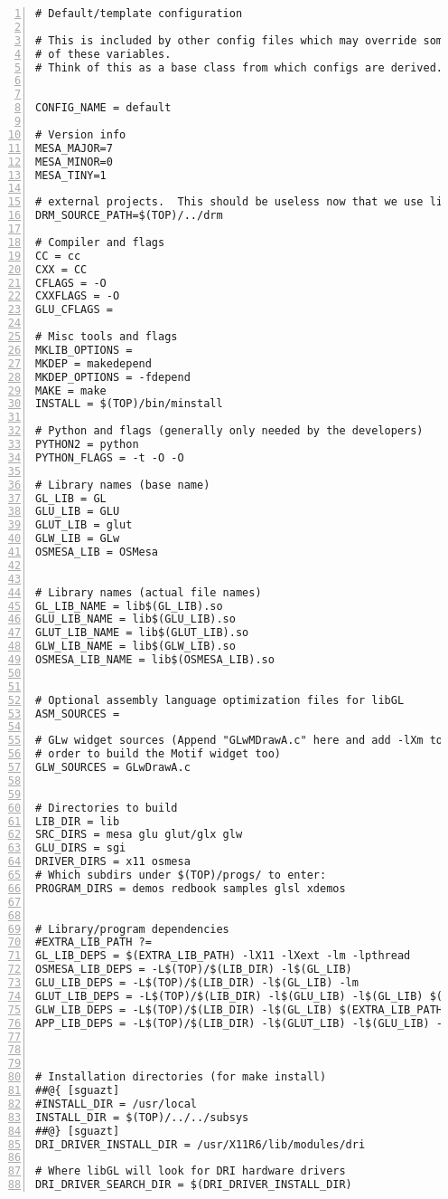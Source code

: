 \begin{lstlisting}[basicstyle={\small\ttfamily},breaklines=true,frame=single,numbers=left]
# Default/template configuration

# This is included by other config files which may override some
# of these variables.
# Think of this as a base class from which configs are derived.


CONFIG_NAME = default

# Version info
MESA_MAJOR=7
MESA_MINOR=0
MESA_TINY=1

# external projects.  This should be useless now that we use libdrm.
DRM_SOURCE_PATH=$(TOP)/../drm

# Compiler and flags
CC = cc
CXX = CC
CFLAGS = -O
CXXFLAGS = -O
GLU_CFLAGS = 

# Misc tools and flags
MKLIB_OPTIONS = 
MKDEP = makedepend
MKDEP_OPTIONS = -fdepend
MAKE = make
INSTALL = $(TOP)/bin/minstall

# Python and flags (generally only needed by the developers)
PYTHON2 = python
PYTHON_FLAGS = -t -O -O

# Library names (base name)
GL_LIB = GL
GLU_LIB = GLU
GLUT_LIB = glut
GLW_LIB = GLw
OSMESA_LIB = OSMesa


# Library names (actual file names)
GL_LIB_NAME = lib$(GL_LIB).so
GLU_LIB_NAME = lib$(GLU_LIB).so
GLUT_LIB_NAME = lib$(GLUT_LIB).so
GLW_LIB_NAME = lib$(GLW_LIB).so
OSMESA_LIB_NAME = lib$(OSMESA_LIB).so


# Optional assembly language optimization files for libGL
ASM_SOURCES = 

# GLw widget sources (Append "GLwMDrawA.c" here and add -lXm to GLW_LIB_DEPS in
# order to build the Motif widget too)
GLW_SOURCES = GLwDrawA.c


# Directories to build
LIB_DIR = lib
SRC_DIRS = mesa glu glut/glx glw
GLU_DIRS = sgi
DRIVER_DIRS = x11 osmesa
# Which subdirs under $(TOP)/progs/ to enter:
PROGRAM_DIRS = demos redbook samples glsl xdemos


# Library/program dependencies
#EXTRA_LIB_PATH ?=
GL_LIB_DEPS = $(EXTRA_LIB_PATH) -lX11 -lXext -lm -lpthread
OSMESA_LIB_DEPS = -L$(TOP)/$(LIB_DIR) -l$(GL_LIB)
GLU_LIB_DEPS = -L$(TOP)/$(LIB_DIR) -l$(GL_LIB) -lm
GLUT_LIB_DEPS = -L$(TOP)/$(LIB_DIR) -l$(GLU_LIB) -l$(GL_LIB) $(EXTRA_LIB_PATH) -lX11 -lXmu -lXt -lXi -lm
GLW_LIB_DEPS = -L$(TOP)/$(LIB_DIR) -l$(GL_LIB) $(EXTRA_LIB_PATH) -lXt -lX11
APP_LIB_DEPS = -L$(TOP)/$(LIB_DIR) -l$(GLUT_LIB) -l$(GLU_LIB) -l$(GL_LIB) -lm



# Installation directories (for make install)
##@{ [sguazt]
#INSTALL_DIR = /usr/local
INSTALL_DIR = $(TOP)/../../subsys
##@} [sguazt]
DRI_DRIVER_INSTALL_DIR = /usr/X11R6/lib/modules/dri

# Where libGL will look for DRI hardware drivers
DRI_DRIVER_SEARCH_DIR = $(DRI_DRIVER_INSTALL_DIR)
\end{lstlisting}
